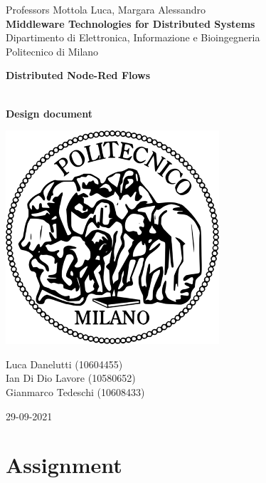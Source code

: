 \documentclass[a4paper, 12pt]{extarticle}
\begin{document}
\begin{titlepage}
	\centering
    
    {\normalsize 
        Professors Mottola Luca, Margara Alessandro\\
        \textbf{Middleware Technologies for Distributed Systems} \\ 
		Dipartimento di Elettronica, Informazione e Bioingegneria\\
		Politecnico di Milano \\\par
    }     
    \vspace{3cm}
    {\LARGE \textbf{Distributed Node-Red Flows} }
    \vspace{0.5cm}
    {\large \textbf{\\ Design document} \par}     
    \vspace{4cm}
	\includegraphics[scale=0.4]{images/polimi.png}\\
	\vspace {3cm}
	
    {\normalsize 
	Luca Danelutti (10604455) \\ 
	Ian Di Dio Lavore (10580652)\\ 
	Gianmarco Tedeschi (10608433) \par
	}     
    
    \vspace{3cm}


	{\normalsize 29-09-2021 \par}
	
\end{titlepage}

\tableofcontents
\newpage

\section{Assignment}
\end{document}
